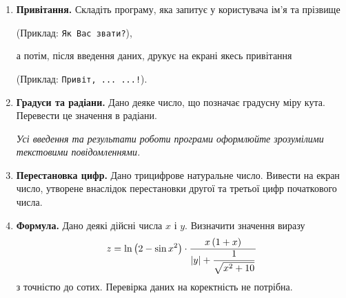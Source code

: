 \begin{enumerate}

\item \textbf{Привітання.} Складіть програму, яка запитує у користувача ім'я та прізвище

(Приклад: \verb|Як Вас звати?|),

а потім, після введення даних, друкує на екрані якесь привітання

(Приклад: \verb|Привіт, ... ...!|).

\item \textbf{Градуси та радіани.} Дано деяке число, що позначає градусну міру кута. Перевести це значення в радіани.

{\itshape Усі введення та результати роботи програми оформлюйте зрозумілими текстовими повідомленнями.}

\item \textbf{Перестановка цифр.} Дано трицифрове натуральне число. Вивести на екран число, утворене внаслідок перестановки другої та третьої цифр початкового числа.

\item \textbf{Формула.} Дано деякі дійсні числа $x$ і $y$. Визначити значення виразу
$$
z=\ln \left(2-\sin x^2\right)\cdot\dfrac{x\,(1+x)}{|y|+\dfrac{1}{\sqrt{\mathstrut \mathstrut x ^2+10}}}
$$
з точністю до сотих. Перевірка даних на коректність не потрібна.
\end{enumerate}








